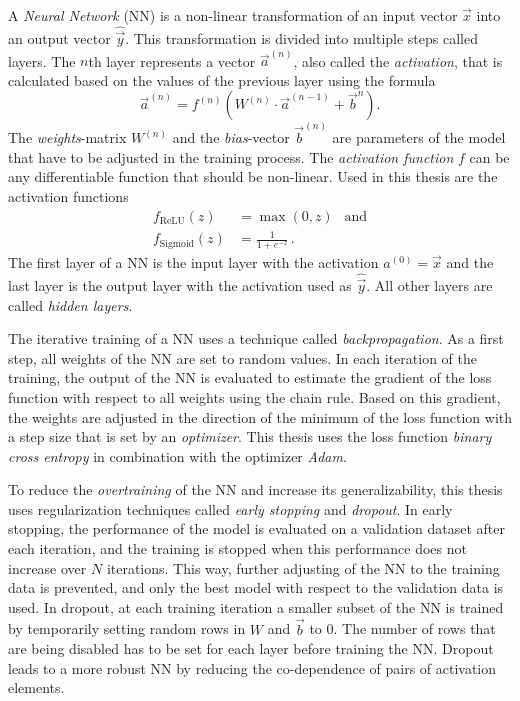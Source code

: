 
A \emph{Neural Network} (NN) is a non-linear transformation of an input vector $\vec{x}$ into an output vector $\hat{\vec{y}}$.
This transformation is divided into multiple steps called layers.
The $n$th layer represents a vector $\vec{a}^{(n)}$, also called the \emph{activation}, that is calculated based on the values of the previous layer using the formula
\begin{equation}
    \vec{a}^{(n)} = f^{(n)}\left( W^{(n)} \cdot \vec{a}^{(n-1)} + \vec{b}^{n} \right).
\end{equation}
The \emph{weights}-matrix $W^{(n)}$ and the \emph{bias}-vector $\vec{b}^{(n)}$ are parameters of the model that have to be adjusted in the training process.
The \emph{activation function} $f$ can be any differentiable function that should be non-linear.
Used in this thesis are the activation functions
\begin{align}
    f_\text{ReLU}(z) &= \max(0, z) \:\:\text{  and} \\
    f_\text{Sigmoid}(z) &= \frac{1}{1+e^{-z}} \, .
\end{align}
The first layer of a NN is the input layer with the activation $a^{(0)}=\vec{x}$ and the last layer is the output layer with the activation used as $\hat{\vec{y}}$.
All other layers are called \emph{hidden layers}.

The iterative training of a NN uses a technique called \emph{backpropagation}.
As a first step, all weights of the NN are set to random values.
In each iteration of the training, the output of the NN is evaluated to estimate the gradient of the loss function with respect to all weights using the chain rule.
Based on this gradient, the weights are adjusted in the direction of the minimum of the loss function with a step size that is set by an \emph{optimizer}.
This thesis uses the loss function \emph{binary cross entropy} in combination with the optimizer \emph{Adam}\cite{adam}.

To reduce the \emph{overtraining} of the NN and increase its generalizability, this thesis uses regularization techniques called \emph{early stopping} and \emph{dropout}.
In early stopping, the performance of the model is evaluated on a validation dataset after each iteration, and the training is stopped when this performance does not increase over $N$ iterations.
This way, further adjusting of the NN to the training data is prevented, and only the best model with respect to the validation data is used.
In dropout, at each training iteration a smaller subset of the NN is trained by temporarily setting random rows in $W$ and $\vec{b}$ to 0.
The number of rows that are being disabled has to be set for each layer before training the NN.
Dropout leads to a more robust NN by reducing the co-dependence of pairs of activation elements.

